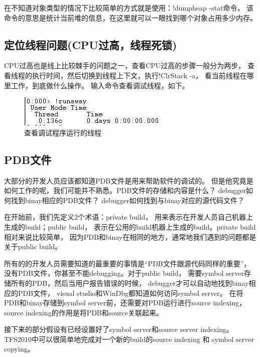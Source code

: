 \documentclass{book}
\begin{document}
在不知道对象类型的情况下比较简单的方式就是使用：!dumpheap -stat命令，
该命令的意思是统计当前堆的信息，在这里就可以一眼找到哪个对象占用多少内存。


\subsection{定位线程问题(CPU过高，线程死锁)}

CPU过高也是线上比较棘手的问题之一，查看CPU过高的步骤一般分为两步，
查看线程的执行时间，然后切换到线程上下文，执行!ClrStack -a，
看当前线程在哪里工作，到底做什么操作。
输入命令查看调试线程，如下。

\begin{figure}[htbp]
	\centering
	\includegraphics[scale=0.8]{DetectDebugProssAllThread.jpg}
	\caption{查看调试程序运行的线程}
	\label{fig:DetectDebugProssAllThread}
\end{figure}



\subsection{PDB文件}

大部分的开发人员应该都知道PDB文件是用来帮助软件的调试的。
但是他究竟是如何工作的呢，我们可能并不熟悉。PDB文件的存储和内容是什么？
debugger如何找到binay相应的PDB文件？
debugger如何找到与binay对应的源代码文件？ 

在开始前，我们先定义2个术语：private build， 
用来表示在开发人员自己机器上生成的build；public build，
表示在公用的build机器上生成的build。private build相对来说比较简单，
因为PDB和binay在相同的地方，通常地我们遇到的问题都是关于public build。  
 
所有的的开发人员需要知道的最重要的事情是“PDB文件跟源代码同样的重要”， 
没有PDB文件，你甚至不能debugging。对于public build，
需要symbol server存储所有的PDB，然后当用户报告错误的时候，
debugger才可以自动地找到binay相应的PDB文件， 
visual studio和WinDbg都知道如何访问symbol server。
在将PDB和binay存储到symbol server前，还需要对PDB运行进行source indexing， 
source indexing的作用是将PDB和source关联起来。  
 
接下来的部分假设有已经设置好了symbol server和source server indexing。
TFS2010中可以很简单地完成对一个新的build的source indexing 和 symbol server copying。
\end{document}
